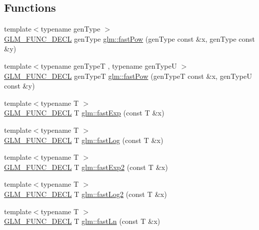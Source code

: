 \subsection*{Functions}
\begin{DoxyCompactItemize}
\item 
{\footnotesize template$<$typename gen\+Type $>$ }\\\hyperlink{setup_8hpp_ab2d052de21a70539923e9bcbf6e83a51}{G\+L\+M\+\_\+\+F\+U\+N\+C\+\_\+\+D\+E\+CL} gen\+Type \hyperlink{group__gtx__fast__exponential_ga842ec5e981c76f8aae7ae14972795378}{glm\+::fast\+Pow} (gen\+Type const \&x, gen\+Type const \&y)
\item 
{\footnotesize template$<$typename gen\+TypeT , typename gen\+TypeU $>$ }\\\hyperlink{setup_8hpp_ab2d052de21a70539923e9bcbf6e83a51}{G\+L\+M\+\_\+\+F\+U\+N\+C\+\_\+\+D\+E\+CL} gen\+TypeT \hyperlink{group__gtx__fast__exponential_ga08af6240d87ce7b9851c9095808c1eb8}{glm\+::fast\+Pow} (gen\+TypeT const \&x, gen\+TypeU const \&y)
\item 
{\footnotesize template$<$typename T $>$ }\\\hyperlink{setup_8hpp_ab2d052de21a70539923e9bcbf6e83a51}{G\+L\+M\+\_\+\+F\+U\+N\+C\+\_\+\+D\+E\+CL} T \hyperlink{group__gtx__fast__exponential_ga22a548f1bf42c53898c140e56af16529}{glm\+::fast\+Exp} (const T \&x)
\item 
{\footnotesize template$<$typename T $>$ }\\\hyperlink{setup_8hpp_ab2d052de21a70539923e9bcbf6e83a51}{G\+L\+M\+\_\+\+F\+U\+N\+C\+\_\+\+D\+E\+CL} T \hyperlink{group__gtx__fast__exponential_ga0130dd03ca124c27dc2094de7ee47e8a}{glm\+::fast\+Log} (const T \&x)
\item 
{\footnotesize template$<$typename T $>$ }\\\hyperlink{setup_8hpp_ab2d052de21a70539923e9bcbf6e83a51}{G\+L\+M\+\_\+\+F\+U\+N\+C\+\_\+\+D\+E\+CL} T \hyperlink{group__gtx__fast__exponential_ga62216328ac3af1811add813d0804437d}{glm\+::fast\+Exp2} (const T \&x)
\item 
{\footnotesize template$<$typename T $>$ }\\\hyperlink{setup_8hpp_ab2d052de21a70539923e9bcbf6e83a51}{G\+L\+M\+\_\+\+F\+U\+N\+C\+\_\+\+D\+E\+CL} T \hyperlink{group__gtx__fast__exponential_gadff374a7349142c0ae65f476b9bf4886}{glm\+::fast\+Log2} (const T \&x)
\item 
{\footnotesize template$<$typename T $>$ }\\\hyperlink{setup_8hpp_ab2d052de21a70539923e9bcbf6e83a51}{G\+L\+M\+\_\+\+F\+U\+N\+C\+\_\+\+D\+E\+CL} T \hyperlink{group__gtx__fast__exponential_ga8f27c4779039f88ae790a9a69be01630}{glm\+::fast\+Ln} (const T \&x)
\end{DoxyCompactItemize}


